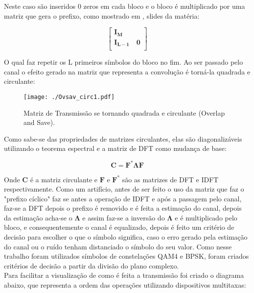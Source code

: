 \documentclass[a4paper,twoside]{articlewithlogo}
\begin{document}
Neste caso são inseridos 0 zeros em cada bloco e o bloco é multiplicado por uma matriz que gera o prefixo, como mostrado em \cite{slidesmateria}, slides da matéria:

\begin{equation*}
\left[
\begin{array}{c}
\mathbf{I_M} \\ 
\hline
\mathbf{I_{L-1}}\quad \mathbf{0}\\  
\end{array}
\right]
\end{equation*}

O qual faz repetir os L primeiros símbolos do bloco no fim. Ao ser passado pelo canal o efeito gerado na matriz que representa a convolução é torná-la quadrada e circulante:


\begin{figure}[H]
	\begin{center}	
		\texttt{[image: ./Ovsav\_circ1.pdf]}
		\caption{Matriz de Transmissão se tornando quadrada e circulante (Overlap and Save).}
		\label{fig:Ovsav_circ}
	\end{center}
\end{figure}

Como sabe-se das propriedades de matrizes circulantes, elas são diagonalizáveis utilizando o teorema espectral e a matriz de DFT como mudança de base:

\begin{equation}
\mathbf{C}=\mathbf{F^*\Lambda F}
\end{equation}

Onde $\mathbf{C}$ é a matriz circulante e $\mathbf{F}$ e $\mathbf{F^*}$ são as matrizes de DFT e IDFT respectivamente.
Como um artifício, antes de ser feito o uso da matriz que faz o "prefixo cíclico" faz se antes a operação de IDFT e após a passagem pelo canal, faz-se a DFT depois o prefixo é removido e é feita a estimação do canal, depois da estimação acha-se o $\mathbf{\Lambda}$ e assim faz-se a inversão do $\mathbf{\Lambda}$ e é multiplicado pelo bloco, e consequentemente o canal é equalizado, depois é feito um critério de decisão para escolher o que o símbolo significa, caso o erro gerado pela estimação do canal ou o ruído tenham distanciado o símbolo do seu valor. Como nesse trabalho foram utilizados símbolos de constelações QAM4 e BPSK, foram criados critérios de decisão a partir da divisão do plano complexo. 
\\Para facilitar a visualização de como é feita a transmissão foi criado o diagrama abaixo, que representa a ordem das operações utilizando dispositivos multitaxas:
\end{document}
